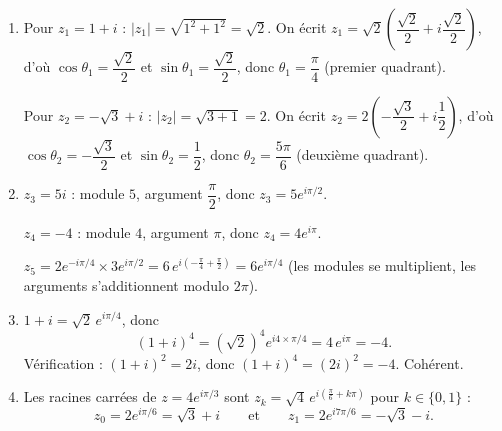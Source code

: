 \documentclass[11pt]{article}
\begin{document}
\begin{corrige}
\begin{enumerate}
\item Pour $z_1 = 1 + i$ : $|z_1| = \sqrt{1^2 + 1^2} = \sqrt{2}$. On écrit $z_1 = \sqrt{2}\left(\dfrac{\sqrt{2}}{2} + i\dfrac{\sqrt{2}}{2}\right)$, d'où $\cos\theta_1 = \dfrac{\sqrt{2}}{2}$ et $\sin\theta_1 = \dfrac{\sqrt{2}}{2}$, donc $\theta_1 = \dfrac{\pi}{4}$ (premier quadrant).

Pour $z_2 = -\sqrt{3} + i$ : $|z_2| = \sqrt{3 + 1} = 2$. On écrit $z_2 = 2\left(-\dfrac{\sqrt{3}}{2} + i\dfrac{1}{2}\right)$, d'où $\cos\theta_2 = -\dfrac{\sqrt{3}}{2}$ et $\sin\theta_2 = \dfrac{1}{2}$, donc $\theta_2 = \dfrac{5\pi}{6}$ (deuxième quadrant).
\item $z_3 = 5i$ : module $5$, argument $\dfrac{\pi}{2}$, donc $z_3 = 5e^{i\pi/2}$.

$z_4 = -4$ : module $4$, argument $\pi$, donc $z_4 = 4e^{i\pi}$.

$z_5 = 2e^{-i\pi/4} \times 3e^{i\pi/2} = 6\,e^{i\left(-\frac{\pi}{4} + \frac{\pi}{2}\right)} = 6e^{i\pi/4}$ (les modules se multiplient, les arguments s'additionnent modulo $2\pi$).
\item $1 + i = \sqrt{2}\,e^{i\pi/4}$, donc
\[ (1+i)^4 = \left(\sqrt{2}\right)^4 e^{i4 \times \pi/4} = 4\,e^{i\pi} = -4. \]
Vérification : $(1+i)^2 = 2i$, donc $(1+i)^4 = (2i)^2 = -4$. Cohérent.
\item Les racines carrées de $z = 4e^{i\pi/3}$ sont $z_k = \sqrt{4}\,e^{i\left(\frac{\pi}{6} + k\pi\right)}$ pour $k \in \{0,1\}$ :
\[ z_0 = 2e^{i\pi/6} = \sqrt{3} + i \qquad \text{et} \qquad z_1 = 2e^{i7\pi/6} = -\sqrt{3} - i. \]
\end{enumerate}
\end{corrige}
\end{document}
